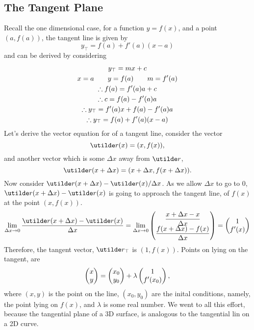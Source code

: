 \documentclass{report}
\begin{document}
\subsection*{The Tangent Plane}
Recall the one dimensional case, for a function $y=f(x)$, and a point $(a, f(a))$, the tangent line is given by
$$
	y_\top = f(a) + f'(a)(x-a)
$$
and can be derived by considering
\begin{gather*}
	y_\top = mx + c \\
	x = a\qquad y = f(a)\qquad m = f'(a) \\
	\therefore f(a) = f'(a)a + c \\
	\therefore c = f(a) - f'(a)a \\
	\therefore y_\top = f'(a)x + f(a) - f'(a)a \\
	\therefore y_\top = f(a) + f'(a)(x-a) 
\end{gather*}
Let's derive the vector equation for of a tangent line, consider the vector
$$
	\ut{r}(x) = (x, f(x)),
$$
and another vector which is some $\Delta x$ away from $\ut{r}$,
$$
	\ut{r}(x+\Delta x) = (x + \Delta x, f(x+\Delta x)).
$$
Now consider $\ut{r}(x+\Delta x) - \ut{r}(x) / \Delta x$. As we allow $\Delta x$ to go to 0, $\ut{r}(x+\Delta x) - \ut{r}(x)$ is going to approach the tangent line, of $f(x)$ at the point $(x,f(x))$.
$$
	\lim_{\Delta x\to 0}\frac{\ut{r}(x+\Delta x) - \ut{r}(x)}{\Delta x} = \lim_{\Delta x\to 0} \begin{pmatrix}
		\dfrac{x + \Delta x - x}{\Delta x} \\
		\dfrac{f(x+\Delta x) - f(x)}{\Delta x}
	\end{pmatrix} = \begin{pmatrix}
		1 \\ f'(x)
	\end{pmatrix}
$$
Therefore, the tangent vector, $\ut{r}_\top$ is $(1, f(x))$. Points on lying on the tangent, are 
$$
	\begin{pmatrix}
		x \\ y
	\end{pmatrix}
	=
	\begin{pmatrix}
		x_0 \\ y_0
	\end{pmatrix}
	+ 
	\lambda \begin{pmatrix}
		1 \\ f'(x_0)
	\end{pmatrix},
$$
where $(x,y)$ is the point on the line, $(x_0, y_0)$ are the inital conditions, namely, the point lying on $f(x)$, and $\lambda$ is some real number. We went to all this effort, because the tangential plane of a 3D surface, is analogous to the tangential lin on a 2D curve.
\end{document}
